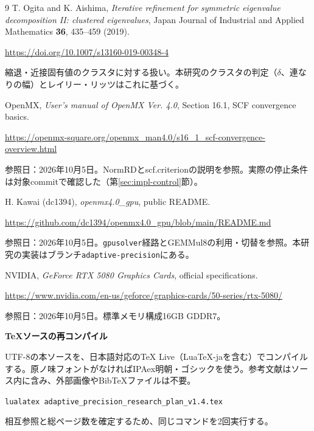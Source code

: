 \documentclass[a4paper,11pt]{ltjsarticle}
\newcommand{\code}[1]{\texttt{#1}}
\begin{document}
\begin{thebibliography}{9}
T. Ogita and K. Aishima,
\textit{Iterative refinement for symmetric eigenvalue decomposition II: clustered eigenvalues},
Japan Journal of Industrial and Applied Mathematics \textbf{36}, 435--459 (2019).\par
\url{https://doi.org/10.1007/s13160-019-00348-4}\par
縮退・近接固有値のクラスタに対する扱い。本研究のクラスタの判定（$\delta$、連なりの幅）とレイリー・リッツはこれに基づく。

OpenMX, \textit{User's manual of OpenMX Ver. 4.0}, Section 16.1, SCF convergence basics.\par
\url{https://openmx-square.org/openmx_man4.0/s16_1_scf-convergence-overview.html}\par
参照日：2026年10月5日。NormRDとscf.criterionの説明を参照。実際の停止条件は対象commitで確認した（第\ref{sec:impl-control}節）。

H. Kawai (dc1394), \textit{openmx4.0\_gpu}, public README.\par
\url{https://github.com/dc1394/openmx4.0_gpu/blob/main/README.md}\par
参照日：2026年10月5日。\code{gpusolver}経路とGEMMul8の利用・切替を参照。本研究の実装はブランチ\code{adaptive-precision}にある。

NVIDIA, \textit{GeForce RTX 5080 Graphics Cards}, official specifications.\par
\url{https://www.nvidia.com/en-us/geforce/graphics-cards/50-series/rtx-5080/}\par
参照日：2026年10月5日。標準メモリ構成16GB GDDR7。
\end{thebibliography}

\vspace{4mm}
\begin{keybox}
\textbf{TeXソースの再コンパイル}\par
UTF-8の本ソースを、日本語対応のTeX Live（LuaTeX-jaを含む）でコンパイルする。原ノ味フォントがなければIPAex明朝・ゴシックを使う。参考文献はソース内に含み、外部画像やBibTeXファイルは不要。\par\medskip
\code{lualatex adaptive\_precision\_research\_plan\_v1.4.tex}\par
相互参照と総ページ数を確定するため、同じコマンドを2回実行する。
\end{keybox}
\end{document}
